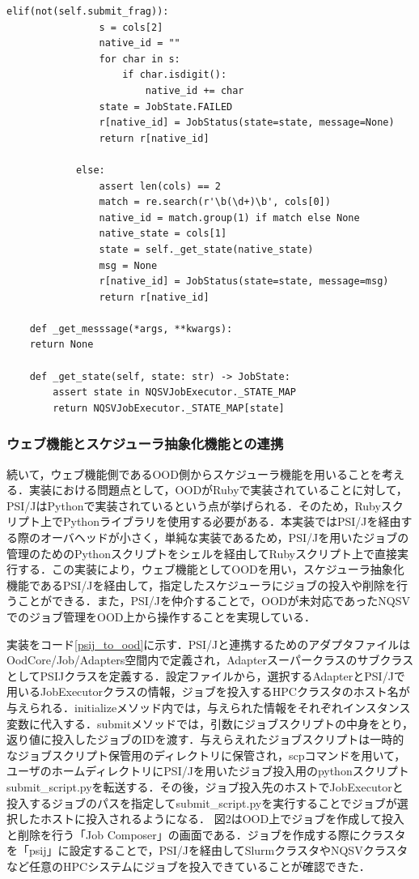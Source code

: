 \begin{lstlisting}[caption=ジョブの状態取得メソッド, label=get_status_now]
            elif(not(self.submit_frag)):
                s = cols[2]
                native_id = ""
                for char in s:
                    if char.isdigit():
                        native_id += char
                state = JobState.FAILED
                r[native_id] = JobStatus(state=state, message=None)
                return r[native_id]
            
            else:
                assert len(cols) == 2
                match = re.search(r'\b(\d+)\b', cols[0])
                native_id = match.group(1) if match else None
                native_state = cols[1]
                state = self._get_state(native_state)
                msg = None
                r[native_id] = JobStatus(state=state, message=msg)
                return r[native_id]
    
    def _get_messsage(*args, **kwargs):  
    return None
    
    def _get_state(self, state: str) -> JobState: 
        assert state in NQSVJobExecutor._STATE_MAP
        return NQSVJobExecutor._STATE_MAP[state]
\end{lstlisting}


\subsubsection{ウェブ機能とスケジューラ抽象化機能との連携}
続いて，ウェブ機能側であるOOD側からスケジューラ機能を用いることを考える．実装における問題点として，OODがRubyで実装されていることに対して，PSI/JはPythonで実装されているという点が挙げられる\cite{cite9}\cite{cite10}．そのため，Rubyスクリプト上でPythonライブラリを使用する必要がある．本実装ではPSI/Jを経由する際のオーバヘッドが小さく，単純な実装であるため，PSI/Jを用いたジョブの管理のためのPythonスクリプトをシェルを経由してRubyスクリプト上で直接実行する．この実装により，ウェブ機能としてOODを用い，スケジューラ抽象化機能であるPSI/Jを経由して，指定したスケジューラにジョブの投入や削除を行うことができる．また，PSI/Jを仲介することで，OODが未対応であったNQSVでのジョブ管理をOOD上から操作することを実現している．\par
実装をコード\ref{psij_to_ood}に示す．PSI/Jと連携するためのアダプタファイルはOodCore/Job/Adapters空間内で定義され，AdapterスーパークラスのサブクラスとしてPSIJクラスを定義する．設定ファイルから，選択するAdapterとPSI/Jで用いるJobExecutorクラスの情報，ジョブを投入するHPCクラスタのホスト名が与えられる．initializeメソッド内では，与えられた情報をそれぞれインスタンス変数に代入する．submitメソッドでは，引数にジョブスクリプトの中身をとり，返り値に投入したジョブのIDを渡す．与えらえれたジョブスクリプトは一時的なジョブスクリプト保管用のディレクトリに保管され，scpコマンドを用いて，ユーザのホームディレクトリにPSI/Jを用いたジョブ投入用のpythonスクリプトsubmit\_script.pyを転送する．その後，ジョブ投入先のホストでJobExecutorと投入するジョブのパスを指定してsubmit\_script.pyを実行することでジョブが選択したホストに投入されるようになる．
図2はOOD上でジョブを作成して投入と削除を行う「Job Composer」の画面である．ジョブを作成する際にクラスタを「psij」に設定することで，PSI/Jを経由してSlurmクラスタやNQSVクラスタなど任意のHPCシステムにジョブを投入できていることが確認できた．\par

